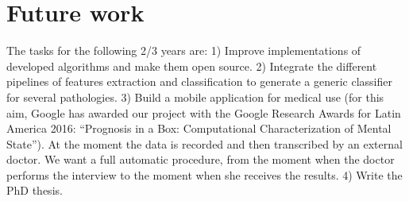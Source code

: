 \documentclass[11pt,a4paper]{article}
\begin{document}
\section{Future work}
The tasks for the following 2/3 years are:  1) Improve implementations of developed algorithms and make them open source. 2) Integrate the different pipelines of features extraction and classification to generate a generic classifier for several pathologies. 3) Build a mobile application for medical use (for this aim, Google has awarded our project with the Google Research Awards for Latin America 2016: “Prognosis in a Box: Computational Characterization of Mental State”). At the moment the data is recorded and then transcribed by an external doctor. We want a full automatic procedure, from the moment when the doctor performs the interview to the moment when she receives the results. 4) Write the PhD thesis.

 

% 



\end{document}
